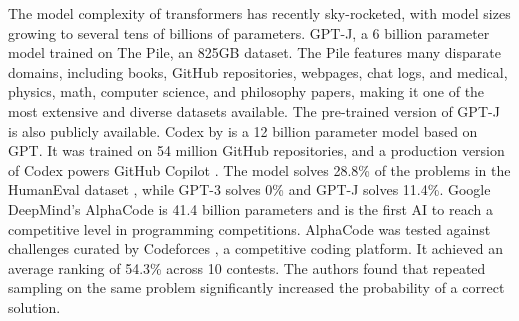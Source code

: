The model complexity of transformers has recently sky-rocketed, with model sizes growing to several tens of billions of parameters. GPT-J, a 6 billion parameter model trained on The Pile, an 825GB dataset. The Pile features many disparate domains, including books, GitHub repositories, webpages, chat logs, and medical, physics, math, computer science, and philosophy papers, making it one of the most extensive and diverse datasets available. The pre-trained version of GPT-J is also publicly available. Codex by \textcite{chen2021codex} is a 12 billion parameter model based on GPT. It was trained on 54 million GitHub repositories, and a production version of Codex powers GitHub Copilot . The model solves 28.8\% of the problems in the HumanEval dataset , while GPT-3 solves 0\% and GPT-J solves 11.4\%. Google DeepMind's AlphaCode \cite{alphacode} is 41.4 billion parameters and is the first AI to reach a competitive level in programming competitions. AlphaCode was tested against challenges curated by Codeforces , a competitive coding platform. It achieved an average ranking of 54.3\% across 10 contests. The authors found that repeated sampling on the same problem significantly increased the probability of a correct solution.



\newcommand*\emptycirc[1][1ex]{\tikz\draw (0,0) circle (#1);} 
\newcommand*\halfcirc[1][1ex]{%
  \begin{tikzpicture}
  \draw[fill] (0,0)-- (90:#1) arc (90:270:#1) -- cycle ;
  \draw (0,0) circle (#1);
  \end{tikzpicture}}
\newcommand*\fullcirc[1][1ex]{\tikz\fill (0,0) circle (#1);} 


